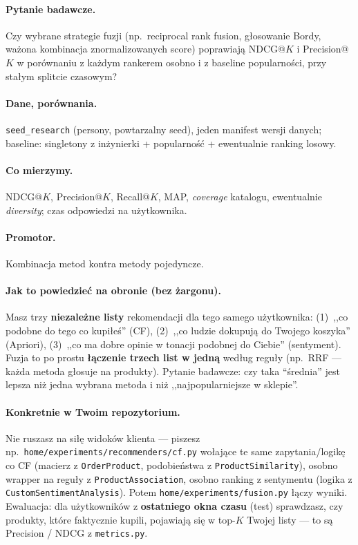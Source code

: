 \documentclass[a4paper,11pt]{article}
\newcommand{\code}[1]{\texttt{\small #1}}
\begin{document}
\paragraph{Pytanie badawcze.}
Czy wybrane strategie fuzji (np.\ reciprocal rank fusion, głosowanie Bordy, ważona kombinacja znormalizowanych score) poprawiają NDCG@$K$ i Precision@$K$ w porównaniu z każdym rankerem osobno i z baseline popularności, przy stałym splitcie czasowym?

\paragraph{Dane, porównania.}
\texttt{seed\_research} (persony, powtarzalny seed), jeden manifest wersji danych; baseline: singletony z inżynierki + popularność + ewentualnie ranking losowy.

\paragraph{Co mierzymy.}
NDCG@$K$, Precision@$K$, Recall@$K$, MAP, \emph{coverage} katalogu, ewentualnie \emph{diversity}; czas odpowiedzi na użytkownika.

\paragraph{Promotor.}
Kombinacja metod kontra metody pojedyncze.

\paragraph{Jak to powiedzieć na obronie (bez żargonu).}
Masz trzy \textbf{niezależne listy} rekomendacji dla tego samego użytkownika: (1)~,,co podobne do tego co kupiłeś'' (CF), (2)~,,co ludzie dokupują do Twojego koszyka'' (Apriori), (3)~,,co ma dobre opinie w tonacji podobnej do Ciebie'' (sentyment). Fuzja to po prostu \textbf{łączenie trzech list w jedną} według reguły (np.\ RRF --- każda metoda głosuje na produkty). Pytanie badawcze: czy taka ``średnia'' jest lepsza niż jedna wybrana metoda i niż ,,najpopularniejsze w sklepie''.

\paragraph{Konkretnie w Twoim repozytorium.}
Nie ruszasz na siłę widoków klienta --- piszesz np.\ \code{home/experiments/recommenders/cf.py} wołające te same zapytania/logikę co CF (macierz z \code{OrderProduct}, podobieństwa z \code{ProductSimilarity}), osobno wrapper na reguły z \code{ProductAssociation}, osobno ranking z sentymentu (logika z \code{CustomSentimentAnalysis}). Potem \code{home/experiments/fusion.py} łączy wyniki. Ewaluacja: dla użytkowników z \textbf{ostatniego okna czasu} (test) sprawdzasz, czy produkty, które faktycznie kupili, pojawiają się w top-$K$ Twojej listy --- to są Precision / NDCG z \code{metrics.py}.
\end{document}
